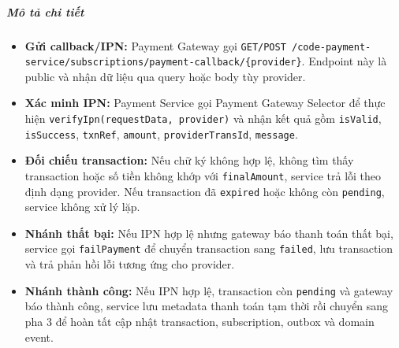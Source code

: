 \subparagraph{Mô tả chi tiết}
\begin{itemize}
\item \textbf{Gửi callback/IPN:} Payment Gateway gọi \texttt{GET/POST /code-payment-service/subscriptions/payment-callback/\{provider\}}. Endpoint này là public và nhận dữ liệu qua query hoặc body tùy provider.
\item \textbf{Xác minh IPN:} Payment Service gọi Payment Gateway Selector để thực hiện \texttt{verifyIpn(requestData, provider)} và nhận kết quả gồm \texttt{isValid}, \texttt{isSuccess}, \texttt{txnRef}, \texttt{amount}, \texttt{providerTransId}, \texttt{message}.
\item \textbf{Đối chiếu transaction:} Nếu chữ ký không hợp lệ, không tìm thấy transaction hoặc số tiền không khớp với \texttt{finalAmount}, service trả lỗi theo định dạng provider. Nếu transaction đã \texttt{expired} hoặc không còn \texttt{pending}, service không xử lý lặp.
\item \textbf{Nhánh thất bại:} Nếu IPN hợp lệ nhưng gateway báo thanh toán thất bại, service gọi \texttt{failPayment} để chuyển transaction sang \texttt{failed}, lưu transaction và trả phản hồi lỗi tương ứng cho provider.
\item \textbf{Nhánh thành công:} Nếu IPN hợp lệ, transaction còn \texttt{pending} và gateway báo thành công, service lưu metadata thanh toán tạm thời rồi chuyển sang pha 3 để hoàn tất cập nhật transaction, subscription, outbox và domain event.
\end{itemize}
